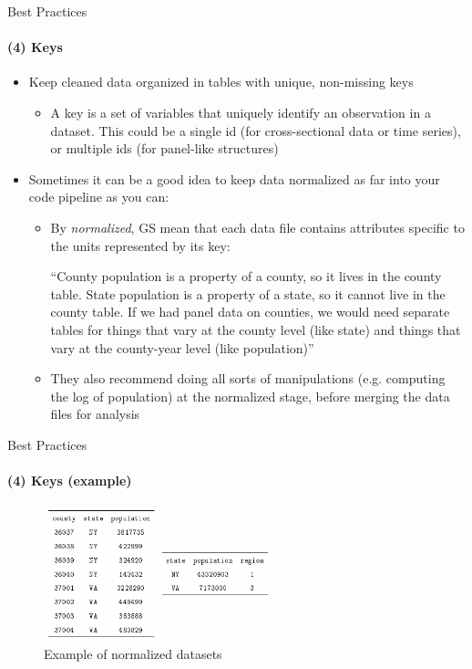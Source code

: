 \documentclass[10pt, aspectratio=169, xcolor=dvipsnames]{beamer}
\let\olditem\item
\renewcommand{\item}{%
\olditem\vspace{0.3em}}
\begin{document}
\begin{frame}[t]{Best Practices}
    \framesubtitle{(4) Keys}

    \normalsize\vspace{0.5em} \begin{itemize}
        \item Keep cleaned data organized in tables with unique, non-missing keys \begin{itemize}
            \item A key is a set of variables that uniquely identify an observation in a dataset. This could be a single id (for cross-sectional data or time series), or multiple ids (for panel-like structures)
        \end{itemize}
        \item Sometimes it can be a good idea to keep data normalized as far into your code pipeline as you can: \begin{itemize}
            \item By \textit{normalized}, GS mean that each data file contains attributes specific to the units represented by its key: 
            
            \qquad ``County population is a property of a county, so it lives in the county table. State population is a property of a state, so it cannot live in the county table. If we had panel data on counties, we would need separate tables for things that vary at the county level (like state) and things that vary at the county-year level (like population)''
            \item They also recommend doing all sorts of manipulations (e.g. computing the log of population) at the normalized stage, before merging the data files for analysis
        \end{itemize}
    \end{itemize}
\end{frame}

\begin{frame}[t]{Best Practices}
    \framesubtitle{(4) Keys (example)}

    \normalsize\vspace{0.5em} \begin{figure}
        \centering
        \caption{Example of normalized datasets}
        \includegraphics[width=0.6\textwidth]{normtable.png}
    \end{figure}
\end{frame}
\end{document}
